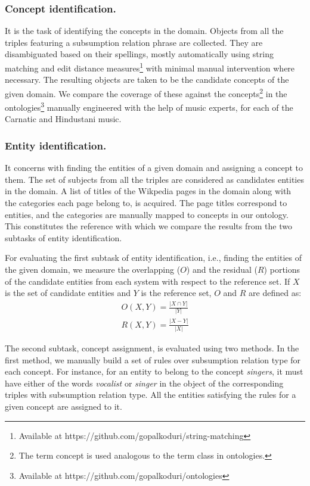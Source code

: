 \documentclass{llncs}
\begin{document}
\subsubsection{Concept identification.} It is the task of identifying the concepts in the domain. Objects from all the triples featuring a subsumption relation phrase are collected. They are disambiguated based on their spellings, mostly automatically using string matching and edit distance measures\footnote{Available at https://github.com/gopalkoduri/string-matching} with minimal manual intervention where necessary. The resulting objects are taken to be the candidate concepts of the given domain. We compare the coverage of these against the concepts\footnote{The term concept is used analogous to the term class in ontologies.} in the ontologies\footnote{Available at https://github.com/gopalkoduri/ontologies} manually engineered with the help of music experts, for each of the Carnatic and Hindustani music.

\subsubsection{Entity identification.} It concerns with finding the entities of a given domain and assigning a concept to them. The set of subjects from all the triples are considered as candidates entities in the domain. A list of titles of the Wikpedia pages in the domain along with the categories each page belong to, is acquired. The page titles correspond to entities, and the categories are manually mapped to concepts in our ontology. This constitutes the reference with which we compare the results from the two subtasks of entity identification.

For evaluating the first subtask of entity identification, i.e., finding the entities of the given domain, we measure the overlapping ($O$) and the residual ($R$) portions of the candidate entities from each system with respect to the reference set. If $X$ is the set of candidate entities and $Y$ is the reference set, $O$ and $R$ are defined as:
\begin{eqnarray}
\label{eq:overlap}
O(X, Y) = \frac{\left|X \cap Y \right|}{\left|Y\right|} \\\nonumber
R(X, Y) = \frac{\left|X - Y \right|}{\left|X\right|}
\end{eqnarray}

The second subtask, concept assignment, is evaluated using two methods. In the first method, we manually build a set of rules over subsumption relation type for each concept. For instance, for an entity to belong to the concept \textit{singers}, it must have either of the words \textit{vocalist} or \textit{singer} in the object of the corresponding triples with subsumption relation type. All the entities satisfying the rules for a given concept are assigned to it.
\end{document}
